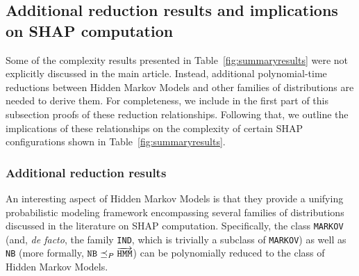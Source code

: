 \subsection{Additional reduction results and implications on SHAP computation}
Some of the complexity results presented in Table~\ref{fig:summaryresults} were not explicitly discussed in the main article. Instead, additional polynomial-time reductions between Hidden Markov Models and other families of distributions are needed to derive them. For completeness, we include in the first part of this subsection proofs of these reduction relationships. Following that, we outline the implications of these relationships on the complexity of certain SHAP configurations shown in Table~\ref{fig:summaryresults}.



\subsubsection{Additional reduction results}

An interesting aspect of Hidden Markov Models is that they provide a unifying probabilistic modeling framework encompassing several families of distributions discussed in the literature on SHAP computation. Specifically, the class \texttt{MARKOV} (and, \textit{de facto}, the family \texttt{IND}, which is trivially a subclass of \texttt{MARKOV}) as well as \texttt{NB} (more formally, $\texttt{NB} \preceq_{P} \overrightarrow{\texttt{\text{HMM}}}$) can be polynomially reduced to the class of Hidden Markov Models.


